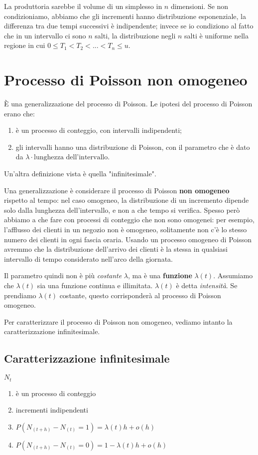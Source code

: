 \documentclass[a4paper,12pt]{book}
\begin{document}
La produttoria sarebbe il volume di un simplesso in $ n $ dimensioni. Se non condizioniamo, abbiamo che gli incrementi hanno distribuzione esponenziale, la differenza tra due tempi successivi è indipendente; invece se io condiziono al fatto che in un intervallo ci sono $ n $ salti, la distribuzione negli $ n $ salti è uniforme nella regione in cui $ 0 \le T_1 < T_2 < ... < T_n \le u $.

\section{Processo di Poisson non omogeneo}
È una generalizzazione del processo di Poisson. Le ipotesi del processo di Poisson erano che:
\begin{enumerate}
	\item è un processo di conteggio, con intervalli indipendenti;
	\item gli intervalli hanno una distribuzione di Poisson, con il parametro che è dato da $\lambda \cdot \text{lunghezza dell'intervallo}$.
\end{enumerate}

Un'altra definizione vista è quella "infinitesimale". 

Una generalizzazione è considerare il processo di Poisson \textbf{non omogeneo} rispetto al tempo: nel caso omogeneo, la distribuzione di un incremento dipende solo dalla lunghezza dell'intervallo, e non a che tempo si verifica. Spesso però abbiamo a che fare con processi di conteggio che non sono omogenei: per esempio, l'afflusso dei clienti in un negozio non è omogeneo, solitamente non c'è lo stesso numero dei clienti in ogni fascia oraria. Usando un processo omogeneo di Poisson avremmo che la distribuzione dell'arrivo dei clienti è la stessa in qualsiasi intervallo di tempo considerato nell'arco della giornata.

Il parametro quindi non è più \textit{costante} $\lambda$, ma è una \textbf{funzione} $\lambda(t)$. Assumiamo che $\lambda(t)$ sia una funzione continua e illimitata. $\lambda(t)$ è detta \textit{intensità}. Se prendiamo $\lambda(t)$ costante, questo corrisponderà al processo di Poisson omogeneo. 

Per caratterizzare il processo di Poisson non omogeneo, vediamo intanto la caratterizzazione infinitesimale.

\subsection{Caratterizzazione infinitesimale} 
$ N_t $
\begin{enumerate}
	\item è un processo di conteggio
	\item incrementi indipendenti
	\item $ P(N_{(t+h)} - N_{(t)} = 1) = \lambda(t) h + o(h) $
	\item $ P(N_{(t+h)} - N_{(t)} = 0) = 1 - \lambda(t) h + o(h) $
\end{enumerate}
\end{document}
